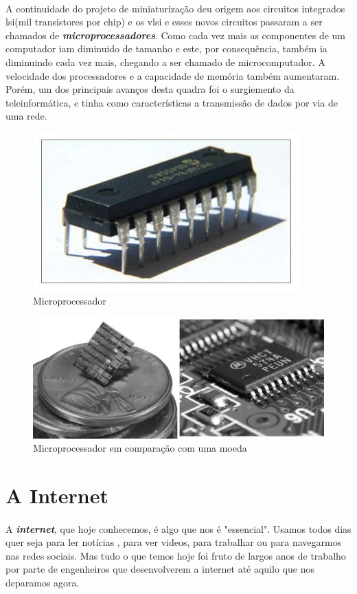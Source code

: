 \documentclass{report}
\begin{document}
\paragraph{}
A continuidade do projeto de miniaturização deu origem aos circuitos integrados \acs{lsi}(mil transistores por chip) e os \acs{vlsi} e esses novos circuitos passaram a ser chamados de \textbf{\textit{microprocessadores}}. Como cada vez mais as componentes de um computador iam diminuido de tamanho e este, por consequência, também ia diminuindo cada vez mais, chegando a ser chamado de microcomputador.	A velocidade dos processadores e a capacidade de memória também aumentaram. Porém, um dos principais avanços desta quadra foi o surgiemento da teleinformática, e tinha como características a transmissão de dados por via de uma rede.

\begin{figure}[H]
\centering
\includegraphics[width=0.6\linewidth]{fig2.png}
\caption{Microprocessador}
\end{figure}

\begin{figure}[H]
\centering
\includegraphics[width=0.6\linewidth]{fig1.png}
\caption{Microprocessador em comparação com uma moeda}
\end{figure}


\section{A Internet}
\paragraph{}
A \textbf{\textit{internet}}\cite{internet}, que hoje conhecemos, é algo que nos é "essencial". Usamos todos dias quer seja para ler notícias , para ver videos, para trabalhar ou para navegarmos nas redes sociais. Mas tudo o que temos hoje foi fruto de largos anos de trabalho por parte de engenheiros que desenvolverem a internet até aquilo que nos deparamos agora.
\end{document}
